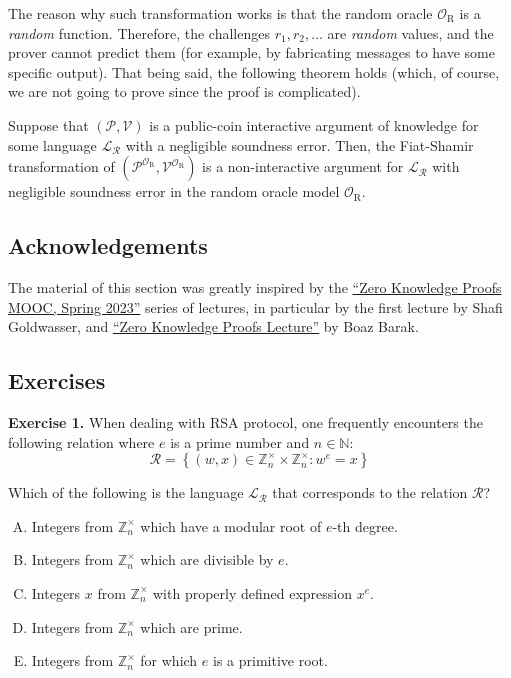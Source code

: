 \documentclass[../../book.tex]{subfiles}
\begin{document}
The reason why such transformation works is that the random oracle
$\mathcal{O}_{\text{R}}$ is a \textit{random} function. Therefore, the
challenges $r_1,r_2,\dots$ are \textit{random} values, and the prover cannot
predict them (for example, by fabricating messages to have some specific
output). That being said, the following theorem holds (which, of course, we are
not going to prove since the proof is complicated).

\begin{theorem}
    Suppose that $(\mathcal{P},\mathcal{V})$ is a public-coin interactive
    argument of knowledge for some language $\mathcal{L}_{\mathcal{R}}$ with a
    negligible soundness error. Then, the Fiat-Shamir transformation of
    $(\mathcal{P}^{\mathcal{O}_{\text{R}}},\mathcal{V}^{\mathcal{O}_{\text{R}}})$
    is a non-interactive argument for $\mathcal{L}_{\mathcal{R}}$ with
    negligible soundness error in the random oracle model
    $\mathcal{O}_{\text{R}}$.
\end{theorem}

\subsection*{Acknowledgements}

The material of this section was greatly inspired by the
\href{https://rdi.berkeley.edu/zk-learning/}{``Zero Knowledge Proofs MOOC,
Spring 2023''} series of lectures, in particular by the first lecture by Shafi
Goldwasser, and
\href{https://www.cs.princeton.edu/courses/archive/fall07/cos433/lec15.pdf}{``Zero
Knowledge Proofs Lecture''} by Boaz Barak.

\subsection{Exercises}

\textbf{Exercise 1.} When dealing with RSA protocol, one frequently encounters the following relation where $e$ is a prime number and $n \in \mathbb{N}$:
\begin{equation*}
    \mathcal{R} = \left\{ (w, x) \in \mathbb{Z}_n^{\times} \times \mathbb{Z}_n^{\times}: w^e = x \right\}
\end{equation*}

Which of the following is the language $\mathcal{L}_{\mathcal{R}}$ that corresponds to the relation $\mathcal{R}$?
\begin{enumerate}[(A)]
    \item Integers from $\mathbb{Z}_n^{\times}$ which have a modular root of $e$-th degree.
    \item Integers from $\mathbb{Z}_n^{\times}$ which are divisible by $e$.
    \item Integers $x$ from $\mathbb{Z}_n^{\times}$ with properly defined expression $x^e$.
    \item Integers from $\mathbb{Z}_n^{\times}$ which are prime.
    \item Integers from $\mathbb{Z}_n^{\times}$ for which $e$ is a primitive root.
\end{enumerate}
\end{document}
